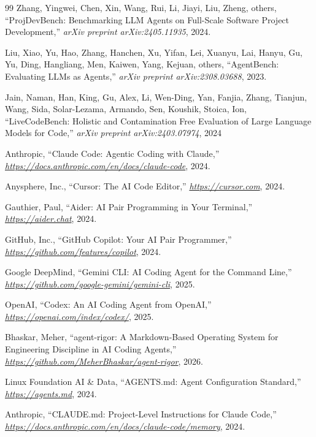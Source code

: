 \documentclass[letterpaper, 10 pt, conference]{ieeeconf}
\begin{document}
\begin{thebibliography}{99}
Zhang, Yingwei, Chen, Xin, Wang, Rui, Li, Jiayi, Liu, Zheng, others, ``{ProjDevBench}: Benchmarking LLM Agents on Full-Scale Software Project Development,'' \emph{arXiv preprint arXiv:2405.11935}, 2024.

Liu, Xiao, Yu, Hao, Zhang, Hanchen, Xu, Yifan, Lei, Xuanyu, Lai, Hanyu, Gu, Yu, Ding, Hangliang, Men, Kaiwen, Yang, Kejuan, others, ``{AgentBench}: Evaluating {LLMs} as Agents,'' \emph{arXiv preprint arXiv:2308.03688}, 2023.

Jain, Naman, Han, King, Gu, Alex, Li, Wen-Ding, Yan, Fanjia, Zhang, Tianjun, Wang, Sida, Solar-Lezama, Armando, Sen, Koushik, Stoica, Ion, ``{LiveCodeBench}: Holistic and Contamination Free Evaluation of Large Language Models for Code,'' \emph{arXiv preprint arXiv:2403.07974}, {2024}

{Anthropic}, ``Claude Code: Agentic Coding with {Claude},'' \emph{\url{https://docs.anthropic.com/en/docs/claude-code}}, 2024.

{Anysphere, Inc.}, ``Cursor: The {AI} Code Editor,'' \emph{\url{https://cursor.com}}, 2024.

Gauthier, Paul, ``Aider: {AI} Pair Programming in Your Terminal,'' \emph{\url{https://aider.chat}}, 2024.

{GitHub, Inc.}, ``{GitHub Copilot}: Your {AI} Pair Programmer,'' \emph{\url{https://github.com/features/copilot}}, 2024.

{Google DeepMind}, ``{Gemini CLI}: {AI} Coding Agent for the Command Line,'' \emph{\url{https://github.com/google-gemini/gemini-cli}}, 2025.

{OpenAI}, ``{Codex}: An {AI} Coding Agent from {OpenAI},'' \emph{\url{https://openai.com/index/codex/}}, 2025.

Bhaskar, Meher, ``agent-rigor: A Markdown-Based Operating System for Engineering Discipline in {AI} Coding Agents,'' \emph{\url{https://github.com/MeherBhaskar/agent-rigor}}, 2026.

{Linux Foundation AI \& Data}, ``{AGENTS.md}: Agent Configuration Standard,'' \emph{\url{https://agents.md}}, 2024.

{Anthropic}, ``{CLAUDE.md}: Project-Level Instructions for {Claude Code},'' \emph{\url{https://docs.anthropic.com/en/docs/claude-code/memory}}, 2024.


\end{thebibliography}
\end{document}
